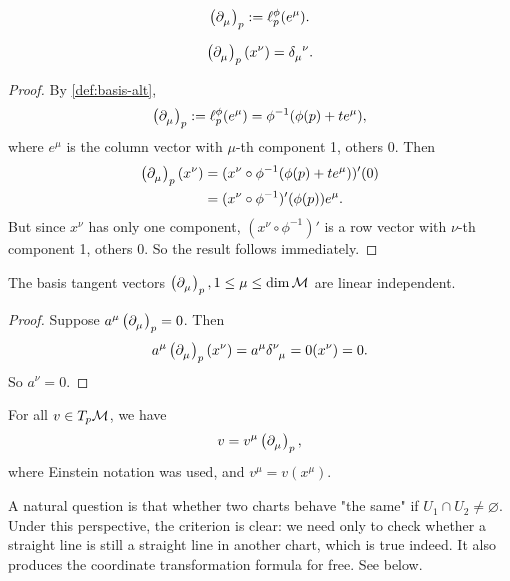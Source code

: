 \documentclass[../main.tex]{subfiles}
\begin{document}
    \begin{definition}\label{def:basis-alt}
        \[
        \tvec{\mu}{p} := \ell_p^\phi(e^\mu).
        \]
    \end{definition}
    \begin{theorem}
        \[
        \tvec{\mu}{p}(x^\nu) = \delta\indices{_\mu^\nu}.
        \]
    \end{theorem}
    \begin{proof}
        By \cref{def:basis-alt}, 
        \[
        \tvec{\mu}{p} := \ell_p^\phi(e^\mu) = \phi ^{-1}(\phi(p)+te^\mu), 
        \]
        where \(e^\mu\) is the column vector with \(\mu\)-th component 1, others 
        0. Then 
        \[
        \begin{aligned}
            \tvec{\mu}{p}(x^\nu)&=(x^\nu\circ\phi ^{-1}(\phi(p)+te^\mu))'(0) \\
            &=(x^\nu \circ \phi ^{-1})'(\phi(p))e^\mu.
        \end{aligned}
        \]
        But since \(x^\nu\) has only one component, \((x^\nu \circ \phi ^{-1})'\) 
        is a row vector with \(\nu\)-th component 1, others 0. So the result 
        follows immediately.
    \end{proof}
    \begin{theorem}\label{thm:linear-indep-basis}
        The basis tangent vectors \(\tvec{\mu}{p}, 1 \leq \mu \leq \dim 
        \manifold[M]\) are linear independent.
    \end{theorem}
    \begin{proof}
        Suppose \(a^\mu\tvec{\mu}{p}=0\). Then 
        \[
        a^\mu\tvec{\mu}{p}(x^\nu)=a^\mu\delta\indices{^\nu_\mu}=0(x^\nu)=0.
        \]
        So \(a^\nu=0\).
    \end{proof}
    \newpage
    \begin{theorem}\label{thm:tangent-vector-coordinates}
        For all \(v \in T_p\manifold[M]\), we have 
        \[
        v=v^\mu\tvec{\mu}{p},
        \]
        where Einstein notation was used, and \(v^\mu = v(x^\mu)\).
    \end{theorem}
    \begin{remark}
        A natural question is that whether two charts behave "the same" if 
        \(U_1 \cap U_2 \neq \varnothing\). Under this perspective, the criterion 
        is clear: we need only to check whether a straight line is still a straight 
        line in another chart, which is true indeed. It also produces the coordinate 
        transformation formula for free. See below.
    \end{remark}
\end{document}
